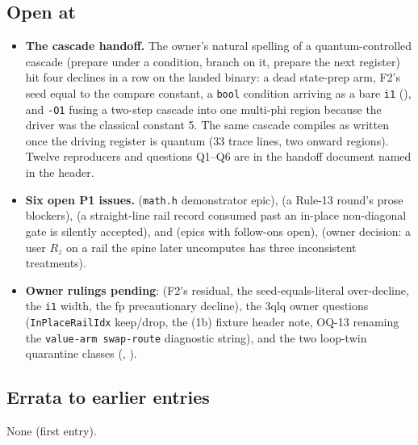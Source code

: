 \subsection*{Open at }
\begin{itemize}
  \item \textbf{The cascade handoff.} The owner's natural spelling of a quantum-controlled
    cascade (prepare under a condition, branch on it, prepare the next register) hit four declines in
    a row on the landed binary: a dead state-prep arm, F2's seed equal to the compare constant, a
    \texttt{bool} condition arriving as a bare \texttt{i1} (), and \texttt{-O1} fusing a
    two-step cascade into one multi-phi region because the driver was the classical constant 5. The
    same cascade compiles as written once the driving register is quantum (33 trace lines, two onward
    regions). Twelve reproducers and questions Q1--Q6 are in the handoff document named in the header.
  \item \textbf{Six open P1 issues.}  (\texttt{math.h} demonstrator epic), 
    (a Rule-13 round's prose blockers),  (a straight-line rail record consumed past an
    in-place non-diagonal gate is silently accepted),  and  (epics with follow-ons
    open),  (owner decision: a user \(R_z\) on a rail the spine later uncomputes has three
    inconsistent treatments).
  \item \textbf{Owner rulings pending}:  (F2's residual, the seed-equals-literal
    over-decline, the \texttt{i1} width, the fp precautionary decline), the 3qlq owner questions
    (\texttt{InPlaceRailIdx} keep/drop, the (1b) fixture header note, OQ-13 renaming the
    \texttt{value-arm swap-route} diagnostic string), and the two loop-twin quarantine classes
    (, ).
\end{itemize}

\subsection*{Errata to earlier entries}
None (first entry).
